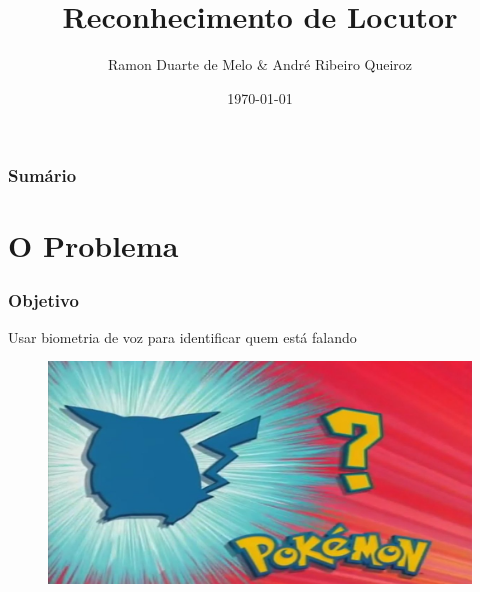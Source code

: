 \documentclass{beamer}
\title[Locutor]{Reconhecimento de Locutor} %
\author{Ramon Duarte de Melo \& André Ribeiro Queiroz} %
\institute[UFRJ] %
{
    Universidade Federal do Rio de Janeiro \\ %
    \medskip
    \textit{ramonduarte@poli.ufrj.br \& handre\_queiroz@poli.ufrj.br} %
}
\date{\today} %
\begin{document}
\begin{frame} %
    \titlepage %
\end{frame}

\begin{frame} %
    \frametitle{Sumário} %
    \tableofcontents 
\end{frame}


\section{O Problema} 

\begin{frame} %
    \frametitle{Objetivo}
    
    Usar biometria de voz para identificar quem está falando

    \begin{figure}[]
        \centering
        \includegraphics[width=\linewidth]{fig1.jpg}
    \end{figure}
\end{frame}
\end{document}
